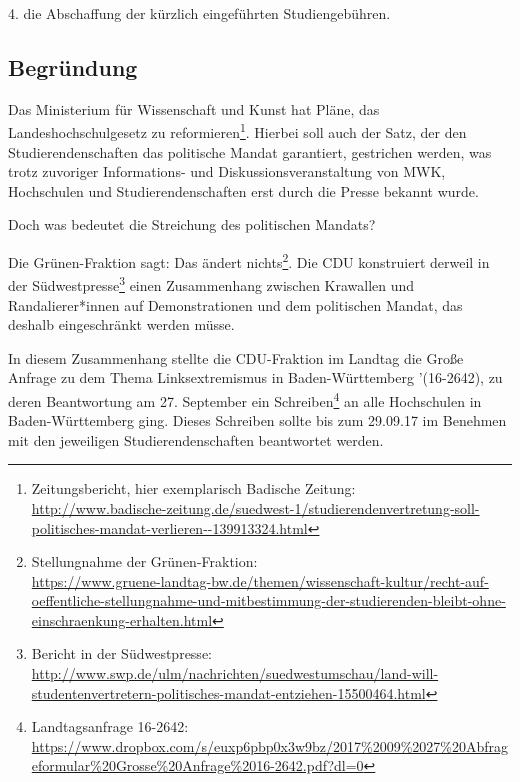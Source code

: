 \documentclass[DIV=calc]{scrartcl}
\begin{document}
4. die Abschaffung der kürzlich eingeführten Studiengebühren.

\subsection*{Begründung}

Das Ministerium für Wissenschaft und Kunst hat Pläne, das Landeshochschulgesetz zu reformieren\footnote{Zeitungsbericht, hier exemplarisch Badische Zeitung:\\
	\url{http://www.badische-zeitung.de/suedwest-1/studierendenvertretung-soll-politisches-mandat-verlieren--139913324.html}
}. Hierbei soll auch der Satz, der den Studierendenschaften das politische Mandat garantiert, gestrichen werden, was trotz zuvoriger Informations- und Diskussionsveranstaltung von MWK, Hochschulen und Studierendenschaften erst durch die Presse bekannt wurde.

\newpage
Doch was bedeutet die Streichung des politischen Mandats?

Die Grünen-Fraktion sagt: Das ändert nichts\footnote{Stellungnahme der Grünen-Fraktion:\\
	\url{https://www.gruene-landtag-bw.de/themen/wissenschaft-kultur/recht-auf-oeffentliche-stellungnahme-und-mitbestimmung-der-studierenden-bleibt-ohne-einschraenkung-erhalten.html}
}. Die CDU konstruiert derweil in der Südwestpresse\footnote{ Bericht in der Südwestpresse:\\
\url{http://www.swp.de/ulm/nachrichten/suedwestumschau/land-will-studentenvertretern-politisches-mandat-entziehen-15500464.html}
} einen Zusammenhang zwischen Krawallen und Randalierer*innen auf Demonstrationen und dem politischen Mandat, das deshalb eingeschränkt werden müsse. 

In diesem Zusammenhang stellte die CDU-Fraktion im Landtag die Große Anfrage  zu dem Thema Linksextremismus in Baden-Württemberg '(16-2642), zu deren Beantwortung am 27. September ein Schreiben\footnote{Landtagsanfrage 16-2642:\\
	\url{https://www.dropbox.com/s/euxp6pbp0x3w9bz/2017\%2009\%2027\%20Abfrageformular\%20Grosse\%20Anfrage\%2016-2642.pdf?dl=0}} an alle Hochschulen in Baden-Württemberg ging. Dieses Schreiben sollte bis zum 29.09.17 im Benehmen mit den jeweiligen Studierendenschaften beantwortet werden.
\end{document}
